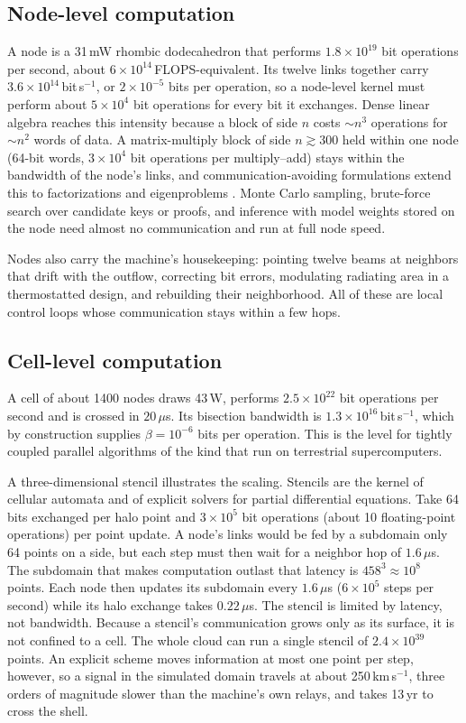 \documentclass[final,5p]{elsarticle}
\begin{document}
\subsection{Node-level computation}
A node is a 31\,mW rhombic dodecahedron that performs $1.8\times10^{19}$ bit operations per second, about $6\times10^{14}$\,FLOPS-equivalent. Its twelve links together carry $3.6\times10^{14}$\,bit\,s$^{-1}$, or $2\times10^{-5}$ bits per operation, so a node-level kernel must perform about $5\times10^4$ bit operations for every bit it exchanges. Dense linear algebra reaches this intensity because a block of side $n$ costs $\sim n^3$ operations for $\sim n^2$ words of data. A matrix-multiply block of side $n\gtrsim300$ held within one node (64-bit words, $3\times10^4$ bit operations per multiply--add) stays within the bandwidth of the node's links, and communication-avoiding formulations extend this to factorizations and eigenproblems \citep{Ballard2011}. Monte Carlo sampling, brute-force search over candidate keys or proofs, and inference with model weights stored on the node need almost no communication and run at full node speed.

Nodes also carry the machine's housekeeping: pointing twelve beams at neighbors that drift with the outflow, correcting bit errors, modulating radiating area in a thermostatted design, and rebuilding their neighborhood. All of these are local control loops whose communication stays within a few hops.

\subsection{Cell-level computation}
A cell of about 1400 nodes draws 43\,W, performs $2.5\times10^{22}$ bit operations per second and is crossed in $20\,\mu$s. Its bisection bandwidth is $1.3\times10^{16}$\,bit\,s$^{-1}$, which by construction supplies $\beta=10^{-6}$ bits per operation. This is the level for tightly coupled parallel algorithms of the kind that run on terrestrial supercomputers.

A three-dimensional stencil illustrates the scaling. Stencils are the kernel of cellular automata and of explicit solvers for partial differential equations. Take 64 bits exchanged per halo point and $3\times10^5$ bit operations (about 10 floating-point operations) per point update. A node's links would be fed by a subdomain only 64 points on a side, but each step must then wait for a neighbor hop of $1.6\,\mu$s. The subdomain that makes computation outlast that latency is $458^3\approx10^8$ points. Each node then updates its subdomain every $1.6\,\mu$s ($6\times10^5$ steps per second) while its halo exchange takes $0.22\,\mu$s. The stencil is limited by latency, not bandwidth. Because a stencil's communication grows only as its surface, it is not confined to a cell. The whole cloud can run a single stencil of $2.4\times10^{39}$ points. An explicit scheme moves information at most one point per step, however, so a signal in the simulated domain travels at about 250\,km\,s$^{-1}$, three orders of magnitude slower than the machine's own relays, and takes 13\,yr to cross the shell.
\end{document}
